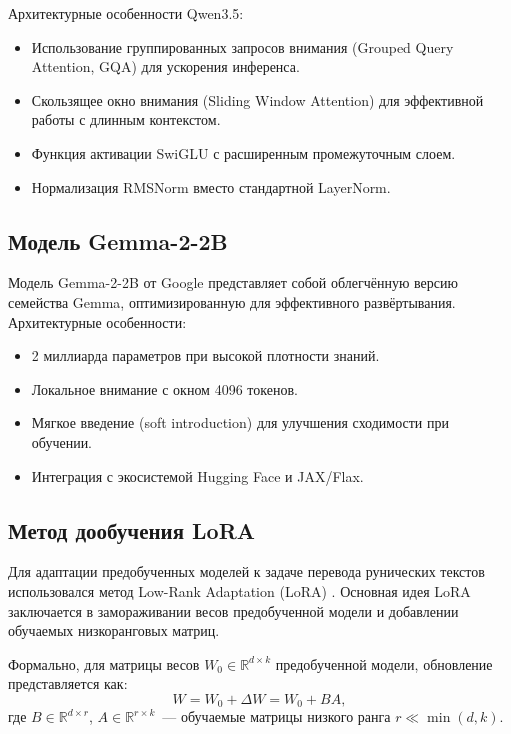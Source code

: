 \documentclass[14pt,a4paper]{extreport}
\begin{document}
Архитектурные особенности Qwen3.5:
\begin{itemize}
    \item Использование группированных запросов внимания (Grouped Query Attention, GQA) для ускорения инференса.
    \item Скользящее окно внимания (Sliding Window Attention) для эффективной работы с длинным контекстом.
    \item Функция активации SwiGLU с расширенным промежуточным слоем.
    \item Нормализация RMSNorm вместо стандартной LayerNorm.
\end{itemize}

\subsection{Модель Gemma-2-2B}

Модель Gemma-2-2B от Google представляет собой облегчённую версию семейства Gemma, оптимизированную для эффективного развёртывания. Архитектурные особенности:

\begin{itemize}
    \item 2 миллиарда параметров при высокой плотности знаний.
    \item Локальное внимание с окном 4096 токенов.
    \item Мягкое введение (soft introduction) для улучшения сходимости при обучении.
    \item Интеграция с экосистемой Hugging Face и JAX/Flax.
\end{itemize}

\subsection{Метод дообучения LoRA}

Для адаптации предобученных моделей к задаче перевода рунических текстов использовался метод Low-Rank Adaptation (LoRA) \cite{hu2021lora}. Основная идея LoRA заключается в замораживании весов предобученной модели и добавлении обучаемых низкоранговых матриц.

Формально, для матрицы весов $W_0 \in \mathbb{R}^{d \times k}$ предобученной модели, обновление представляется как:
\begin{equation}
W = W_0 + \Delta W = W_0 + BA,
\end{equation}
где $B \in \mathbb{R}^{d \times r}$, $A \in \mathbb{R}^{r \times k}$~--- обучаемые матрицы низкого ранга $r \ll \min(d, k)$.
\end{document}
